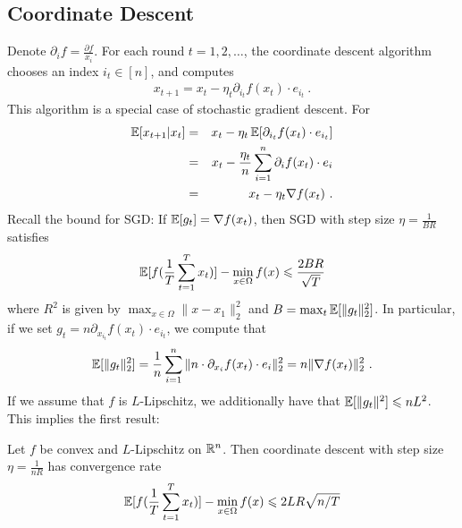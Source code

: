 \subsection{Coordinate Descent}
  Denote $\partial_i f= \frac{\partial f}{x_i}$.
  For each round $t = 1,2,\dots$, the coordinate descent algorithm
  chooses an index $i_t \in [n]$, and computes
	\begin{eqnarray}
	x_{t+1} = x_t - \eta_t\partial_{i_t}f(x_t) \cdot e_{i_t} \ .
	\end{eqnarray}
  This algorithm is a special case of stochastic gradient descent. For
	\begin{eqnarray}
    \operatorname*{\mathbb{E}}[x_{t+1} | x_t]
    &=& x_t - \eta_t \operatorname*{\mathbb{E}} [\partial_{i_t}f(x_t) \cdot e_{i_t}] \\
    &=& x_t - \frac{\eta_t}{n} \sum_{i=1}^n \partial_{i}f(x_t) \cdot e_i \\
    &=& x_t - \eta_t \nabla f(x_t) \ .
	\end{eqnarray}
	Recall the bound for SGD: If $\operatorname*{\mathbb{E}}[g_t] = \nabla f(x_t)$, then SGD with step size $\eta = \frac{1}{BR}$ satisfies
	\begin{eqnarray}
	\operatorname*{\mathbb{E}}[f(\frac{1}{T}\sum_{t=1}^T x_t)] - \min_{x \in \Omega}f(x) \leqslant \frac{2 BR}{\sqrt{T}}
	\end{eqnarray}
	where $R^2$ is given by $\max_{x \in \Omega} \|x-x_1\|^2_2$ and $B = \max_{t}\operatorname*{\mathbb{E}}[\|g_t\|^2_2]$. In particular, if we set $g_t = n \partial_{x_{i_t}}f(x_t) \cdot e_{i_t}$, we compute that
	\begin{eqnarray}
    \operatorname*{\mathbb{E}}[\|g_t\|^2_2]
    = \frac{1}{n} \sum_{i=1}^n \|n\cdot \partial_{x_{i}}f(x_t) \cdot e_i\|^2_2
    = n \|\nabla f(x_t)\|^2_2 \ .
	\end{eqnarray}
	If we assume that $f$ is $L$-Lipschitz, we additionally have that 
	$\operatorname*{\mathbb{E}}[\|g_t\|^2] \leqslant nL^2$.
  This implies the first result:
	\begin{proposition} Let $f$ be convex and $L$-Lipschitz on $\mathbb{R}^n$.
    Then coordinate descent with step size $\eta = \frac{1}{n R}$ has convergence rate 
	\begin{eqnarray}
	\operatorname*{\mathbb{E}}[f(\frac{1}{T}\sum_{t=1}^T x_t)] - \min_{x \in \Omega}f(x) \leqslant 2LR\sqrt{n/T}
	\end{eqnarray}
	\end{proposition}
